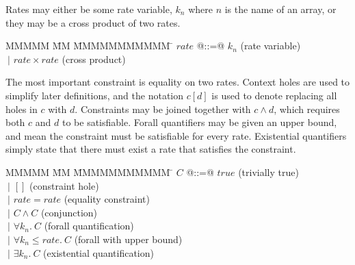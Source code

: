 \newcommand{\constr}[1]{\llbracket #1 \rrbracket}
\newcommand{\hole}[0]{[]}
\newcommand{\fillhole}[2]{#1\left[#2\right]}

Rates may either be some rate variable, $k_n$ where $n$ is the name of an array, or they may be a cross product of two rates.

\begin{tabbing}
MMMMM       \= MM \= MMMMMMMMMMM \= \kill
$rate$      \> @::=@ \> $k_n$               \> (rate variable)\\
            \> $~|$  \> $rate \times rate$  \> (cross product) \\
\end{tabbing}

The most important constraint is equality on two rates.
Context holes are used to simplify later definitions, and the notation $\fillhole{c}{d}$ is used to denote replacing all holes in $c$ with $d$.
Constraints may be joined together with $c \wedge d$, which requires both $c$ and $d$ to be satisfiable.
Forall quantifiers may be given an upper bound, and mean the constraint must be satisfiable for every rate.
Existential quantifiers simply state that there must exist a rate that satisfies the constraint.


\begin{tabbing}
MMMMM       \= MM \= MMMMMMMMMMM \= \kill
$C$          \> @::=@ \> $true$                                 \> (trivially true) \\
             \> $~|$  \> $\hole$                                \> (constraint hole) \\
             \> $~|$  \> $rate = rate$                          \> (equality constraint) \\
             \> $~|$  \> $C \wedge C$                           \> (conjunction) \\
             \> $~|$  \> $\forall k_n.\ C$                      \> (forall quantification) \\
             \> $~|$  \> $\forall k_n \le rate.\ C$             \> (forall with upper bound) \\
             \> $~|$  \> $\exists k_n.\ C$                      \> (existential quantification)\\
\end{tabbing}

